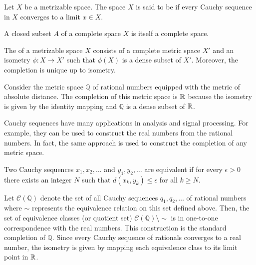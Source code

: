 \begin{definition}
Let $X$ be a metrizable space.
The space $X$ is said to be  if every Cauchy sequence in $X$ converges to a limit $x \in X$.
\end{definition}

\begin{theorem}
A closed subset $A$ of a complete space $X$ is itself a complete space.
\end{theorem}

\begin{definition}
The  of a metrizable space $X$ consists of a complete metric space $X'$ and an isometry $\phi : X \rightarrow X'$ such that $\phi(X)$ is a dense subset of $X'$.
Moreover, the completion is unique up to isometry.
\end{definition}

\begin{example}
Consider the metric space $\mathbb{Q}$ of rational numbers equipped with the metric of absolute distance.
The completion of this metric space is $\mathbb{R}$ because the isometry is given by the identity mapping and $\mathbb{Q}$ is a dense subset of $\mathbb{R}$.
\end{example}

Cauchy sequences have many applications in analysis and signal processing.
For example, they can be used to construct the real numbers from the rational numbers.
In fact, the same approach is used to construct the completion of any metric space.

\begin{definition}
Two Cauchy sequences $x_1, x_2, \ldots$ and $y_1, y_2, \ldots$ are equivalent if for every $\epsilon >0$ there exists an integer $N$ such that $d (x_k, y_k) \leq \epsilon$ for all $k \geq N$.
\end{definition}

\begin{example}
Let $\mathcal{C}(\mathbb{Q})$ denote the set of all Cauchy sequences $q_1, q_2, \ldots$ of rational numbers where $\sim$ represents the equivalence relation on this set defined above.
Then, the set of equivalence classes (or quotient set) $\mathcal{C}(\mathbb{Q}) \setminus \!\! \sim$ is in one-to-one correspondence with the real numbers.
This construction is the standard completion of $\mathbb{Q}$.
Since every Cauchy sequence of rationals converges to a real number, the isometry is given by mapping each equivalence class to its limit point in $\mathbb{R}$.
\end{example}

